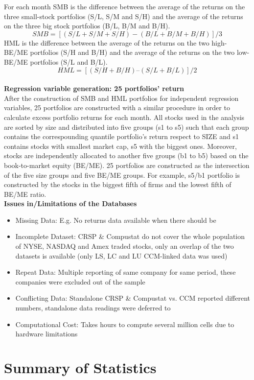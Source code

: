 \documentclass[12pt]{article}
\begin{document}
\noindent For each month SMB is the difference between the average of the returns on the three small-stock portfolios (S/L, S/M and S/H) and the average of the returns on the three big stock portfolios (B/L, B/M and B/H).
$$
SMB=[(S/L+S/M+S/H)-(B/L+B/M+B/H)]/3
$$
HML is the difference between the average of the returns on the two high-BE/ME portfolios (S/H and B/H) and the average of the returns on the two low-BE/ME portfolios (S/L and B/L).
$$
HML = [(S/H+B/H)–(S/L+B/L)]/2
$$
\noindent \\ \textbf{Regression variable generation: 25 portfolios' return}\\
After the construction of SMB and HML portfolios for independent regression variables, 25 portfolios are constructed with a similar procedure in order to calculate excess portfolio returns for each month. All  stocks used in the analysis are sorted by size and distributed into five groups (s1 to s5) such that each group contains the correspounding quantile portfolio's return respect to SIZE and s1 contains stocks with smallest market cap, s5 with the biggest ones. Moreover, stocks are independently allocated to another five groups (b1 to b5) based on the book-to-market equity (BE/ME). 25 portfolios are constructed as the intersection of the five size groups and five BE/ME groups. For example, s5/b1 portfolio is constructed by the stocks in the biggest fifth of firms and the lowest fifth of BE/ME ratio.\\ 

\noindent \textbf{Issues in/Limitations of the Databases}
\begin{itemize}
	\item Missing Data: E.g. No returns data available when there should be
	\item Incomplete Dataset: CRSP \& Compustat do not cover the whole population of NYSE, NASDAQ and Amex traded stocks, only an overlap of the two datasets is available (only LS, LC and LU CCM-linked data was used)
	\item Repeat Data: Multiple reporting of same company for same period, these companies were excluded out of the sample
	\item Conflicting Data: Standalone CRSP \& Compustat vs. CCM reported different numbers, standalone data readings were deferred to
	\item Computational Cost: Takes hours to compute several million cells due to hardware limitations
\end{itemize}
\section{Summary of Statistics}
\end{document}

